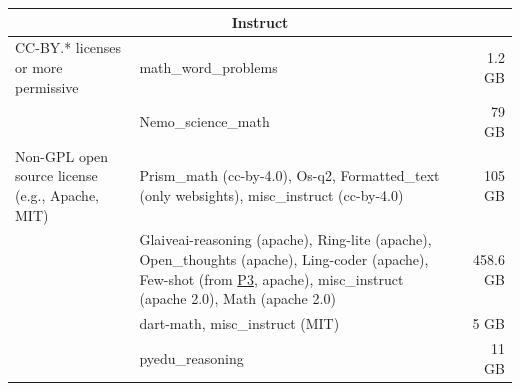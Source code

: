 \begin{longtable}{p{4cm} p{7cm} r}
\multicolumn{3}{c}{\large\textbf{Instruct}} \\
\midrule
CC-BY.* licenses or more permissive & math\_word\_problems & 1.2 GB \\
& Nemo\_science\_math & 79 GB \\
\addlinespace
Non-GPL open source license (e.g., Apache, MIT) & Prism\_math (cc-by-4.0), Os-q2, Formatted\_text (only websights), misc\_instruct (cc-by-4.0) & 105 GB \\
& Glaiveai-reasoning (apache), Ring-lite (apache), Open\_thoughts (apache), Ling-coder (apache), Few-shot (from \href{https://huggingface.co/datasets/Muennighoff/P3}{P3}, apache), misc\_instruct (apache 2.0), Math (apache 2.0) & 458.6 GB \\
& dart-math, misc\_instruct (MIT) & 5 GB \\
& pyedu\_reasoning & 11 GB \\
\end{longtable}
\addtocounter{table}{-1} %
\begin{center}
    \label{tab:breakdown_by_license_type}
\end{center}
